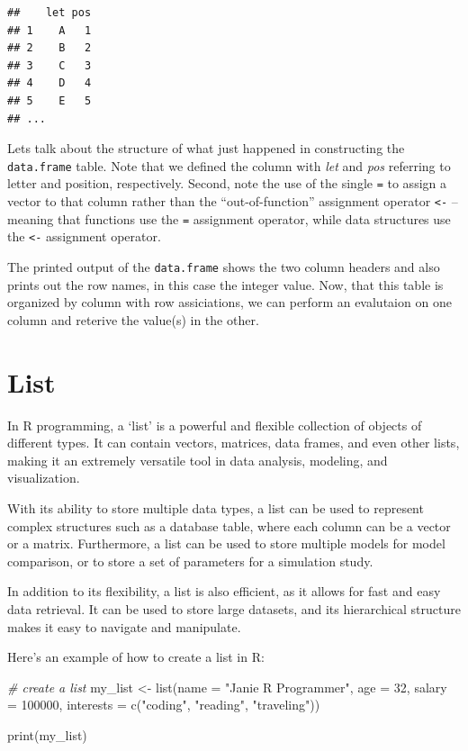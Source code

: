\documentclass[
]{book}
\newenvironment{Shaded}{\begin{snugshade}}{\end{snugshade}}
\newcommand{\AttributeTok}[1]{\textcolor[rgb]{0.77,0.63,0.00}{#1}}
\newcommand{\CommentTok}[1]{\textcolor[rgb]{0.56,0.35,0.01}{\textit{#1}}}
\newcommand{\DecValTok}[1]{\textcolor[rgb]{0.00,0.00,0.81}{#1}}
\newcommand{\FunctionTok}[1]{\textcolor[rgb]{0.00,0.00,0.00}{#1}}
\newcommand{\NormalTok}[1]{#1}
\newcommand{\OtherTok}[1]{\textcolor[rgb]{0.56,0.35,0.01}{#1}}
\newcommand{\StringTok}[1]{\textcolor[rgb]{0.31,0.60,0.02}{#1}}
\begin{document}
\begin{verbatim}
##    let pos
## 1    A   1
## 2    B   2
## 3    C   3
## 4    D   4
## 5    E   5
## ...
\end{verbatim}

Lets talk about the structure of what just happened in constructing the \texttt{data.frame} table. Note that we defined the column with \emph{let} and \emph{pos} referring to letter and position, respectively. Second, note the use of the single \texttt{=} to assign a vector to that column rather than the ``out-of-function'' assignment operator \texttt{\textless{}-} -- meaning that functions use the \texttt{=} assignment operator, while data structures use the \texttt{\textless{}-} assignment operator.

The printed output of the \texttt{data.frame} shows the two column headers and also prints out the row names, in this case the integer value. Now, that this table is organized by column with row assiciations, we can perform an evalutaion on one column and reterive the value(s) in the other.

\hypertarget{list}{%
\section{List}\label{list}}

In R programming, a `list' is a powerful and flexible collection of objects of different types. It can contain vectors, matrices, data frames, and even other lists, making it an extremely versatile tool in data analysis, modeling, and visualization.

With its ability to store multiple data types, a list can be used to represent complex structures such as a database table, where each column can be a vector or a matrix. Furthermore, a list can be used to store multiple models for model comparison, or to store a set of parameters for a simulation study.

In addition to its flexibility, a list is also efficient, as it allows for fast and easy data retrieval. It can be used to store large datasets, and its hierarchical structure makes it easy to navigate and manipulate.

Here's an example of how to create a list in R:

\begin{Shaded}
\begin{Highlighting}[]
\CommentTok{\# create a list}
\NormalTok{my\_list }\OtherTok{\textless{}{-}} \FunctionTok{list}\NormalTok{(}\AttributeTok{name =} \StringTok{"Janie R Programmer"}\NormalTok{,}
                \AttributeTok{age =} \DecValTok{32}\NormalTok{,}
                \AttributeTok{salary =} \DecValTok{100000}\NormalTok{,}
                \AttributeTok{interests =} \FunctionTok{c}\NormalTok{(}\StringTok{"coding"}\NormalTok{, }\StringTok{"reading"}\NormalTok{, }\StringTok{"traveling"}\NormalTok{))}

\FunctionTok{print}\NormalTok{(my\_list)}
\end{Highlighting}
\end{Shaded}
\end{document}
